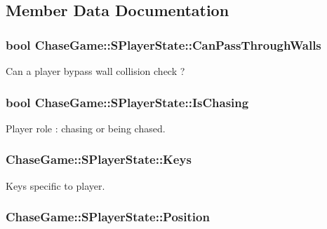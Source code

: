 \subsection{Member Data Documentation}
\hypertarget{struct_chase_game_1_1_s_player_state_acd7030969c414605901e551171078bb1}{
\subsubsection[{Can\-Pass\-Through\-Walls}]{\setlength{\rightskip}{0pt plus 5cm}bool Chase\-Game\-::\-S\-Player\-State\-::\-Can\-Pass\-Through\-Walls}}\label{struct_chase_game_1_1_s_player_state_acd7030969c414605901e551171078bb1}


Can a player bypass wall collision check ? 

\hypertarget{struct_chase_game_1_1_s_player_state_a2574de666d4744daefd7824b1c3c809f}{
\subsubsection[{Is\-Chasing}]{\setlength{\rightskip}{0pt plus 5cm}bool Chase\-Game\-::\-S\-Player\-State\-::\-Is\-Chasing}}\label{struct_chase_game_1_1_s_player_state_a2574de666d4744daefd7824b1c3c809f}


Player role \-: chasing or being chased. 

\hypertarget{struct_chase_game_1_1_s_player_state_a3fc9ce0322ed28ff9c401983d91c69f2}{
\subsubsection[{Keys}]{ Chase\-Game\-::\-S\-Player\-State\-::\-Keys}}\label{struct_chase_game_1_1_s_player_state_a3fc9ce0322ed28ff9c401983d91c69f2}


Keys specific to player. 

\hypertarget{struct_chase_game_1_1_s_player_state_a0a68b95a4255f2a543675f88b00847b4}{
\subsubsection[{Position}]{ Chase\-Game\-::\-S\-Player\-State\-::\-Position}}\label{struct_chase_game_1_1_s_player_state_a0a68b95a4255f2a543675f88b00847b4}


